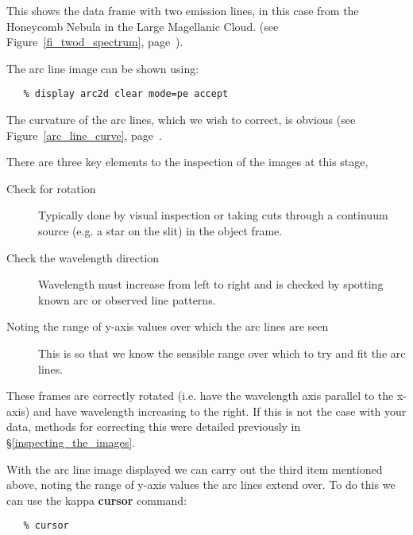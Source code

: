\documentclass[twoside,11pt]{article}
\newcommand{\htmlref}[2]{#1}
\newcommand{\xref}[3]{#1}
\newcommand{\scspec}[2]{#1}
\newcommand{\scspec}[2]{#2}
\begin{document}
This shows the data frame with two emission lines, in this case from
the Honeycomb Nebula in the Large Magellanic Cloud.  (see
\scspec{Figure~\ref{fi_twod_spectrum},
page~\pageref{fi_twod_spectrum}}{The figure in the introduction}).

The arc line image can be shown using:

{
\scspec{\small}{ }
\begin{verbatim}
   % display arc2d clear mode=pe accept
\end{verbatim}
}

The curvature of the arc lines, which we wish to correct, is obvious
(see \scspec{Figure~\ref{arc_line_curve},
page~\pageref{arc_line_curve}}{the previous figure}.

There are three key elements to the inspection of the images at this stage,

\begin{description}

\item [Check for rotation]
      Typically done by visual inspection or taking cuts through a
      continuum source (e.g. a star on the slit) in the object frame.

\item [Check the wavelength direction]
      Wavelength must increase from left to right and is checked by
      spotting known arc or observed line patterns.

\item [Noting the range of y-axis values over which the arc lines are seen]
      This is so that we know the sensible range over which to try and fit the arc lines.

\end{description}


These frames are correctly rotated (i.e. have the wavelength axis
parallel to the x-axis) and have wavelength increasing to the right.
If this is not the case with your data, methods for correcting this
were detailed previously in \scspec{\S\ref{inspecting_the_images}}
{\htmlref{Inspecting the Image}{inspecting_the_images}}.

With the arc line image displayed we can carry out the third item
mentioned above, noting the range of y-axis values the arc lines
extend over. To do this we can use the \xref{{\sc kappa}}{sun95}{}
\xref{{\bf cursor}}{sun95}{CURSOR} command:


{
\scspec{\small}{ }
\begin{verbatim}
   % cursor
\end{verbatim}
}
\end{document}
